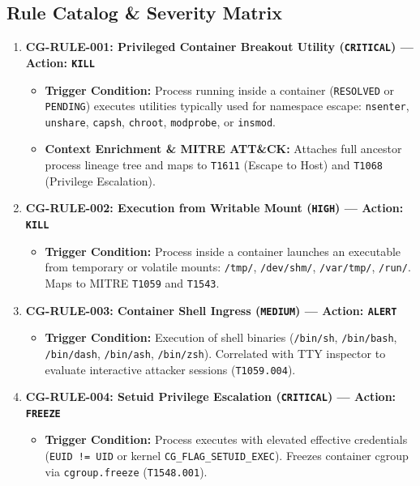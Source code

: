 \documentclass[11pt,a4paper]{article}
\begin{document}
\subsection{Rule Catalog \& Severity Matrix}
\begin{enumerate}
    \item \textbf{CG-RULE-001: Privileged Container Breakout Utility (\texttt{CRITICAL}) --- Action: \texttt{KILL}}
    \begin{itemize}
        \item \textbf{Trigger Condition:} Process running inside a container (\texttt{RESOLVED} or \texttt{PENDING}) executes utilities typically used for namespace escape: \texttt{nsenter}, \texttt{unshare}, \texttt{capsh}, \texttt{chroot}, \texttt{modprobe}, or \texttt{insmod}.
        \item \textbf{Context Enrichment \& MITRE ATT\&CK:} Attaches full ancestor process lineage tree and maps to \texttt{T1611} (Escape to Host) and \texttt{T1068} (Privilege Escalation).
    \end{itemize}
    \item \textbf{CG-RULE-002: Execution from Writable Mount (\texttt{HIGH}) --- Action: \texttt{KILL}}
    \begin{itemize}
        \item \textbf{Trigger Condition:} Process inside a container launches an executable from temporary or volatile mounts: \texttt{/tmp/}, \texttt{/dev/shm/}, \texttt{/var/tmp/}, \texttt{/run/}. Maps to MITRE \texttt{T1059} and \texttt{T1543}.
    \end{itemize}
    \item \textbf{CG-RULE-003: Container Shell Ingress (\texttt{MEDIUM}) --- Action: \texttt{ALERT}}
    \begin{itemize}
        \item \textbf{Trigger Condition:} Execution of shell binaries (\texttt{/bin/sh}, \texttt{/bin/bash}, \texttt{/bin/dash}, \texttt{/bin/ash}, \texttt{/bin/zsh}). Correlated with TTY inspector to evaluate interactive attacker sessions (\texttt{T1059.004}).
    \end{itemize}
    \item \textbf{CG-RULE-004: Setuid Privilege Escalation (\texttt{CRITICAL}) --- Action: \texttt{FREEZE}}
    \begin{itemize}
        \item \textbf{Trigger Condition:} Process executes with elevated effective credentials (\texttt{EUID != UID} or kernel \texttt{CG\_FLAG\_SETUID\_EXEC}). Freezes container cgroup via \texttt{cgroup.freeze} (\texttt{T1548.001}).

\end{itemize}
\end{enumerate}
\end{document}
